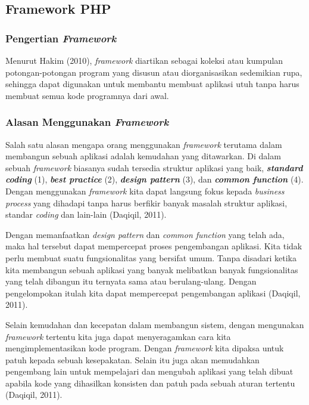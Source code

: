   \subsection{Framework PHP}

    \subsubsection{Pengertian \emph{Framework}}
    Menurut Hakim (2010), \emph{framework} diartikan sebagai koleksi atau kumpulan potongan-potongan program yang disusun atau diorganisasikan sedemikian rupa, sehingga dapat digunakan untuk membantu membuat aplikasi utuh tanpa harus membuat semua kode programnya dari awal.
    
    \subsubsection{Alasan Menggunakan \emph{Framework}}
    Salah satu alasan mengapa orang menggunakan \emph{framework} terutama dalam membangun sebuah aplikasi adalah kemudahan yang ditawarkan. Di dalam sebuah  \emph{framework} biasanya sudah tersedia struktur aplikasi yang baik, \textbf{\emph{standard coding}} (1), \textbf{\emph{best practice}} (2), \textbf{\emph{design pattern}} (3), dan \textbf{\emph{common function}} (4). Dengan menggunakan \emph{framework} kita dapat langsung fokus kepada \emph{business process} yang dihadapi tanpa harus berfikir banyak masalah struktur aplikasi, standar \emph{coding} dan lain-lain (Daqiqil, 2011).
    
    Dengan memanfaatkan \emph{design pattern} dan \emph{common function} yang telah ada, maka hal tersebut dapat mempercepat proses pengembangan aplikasi. Kita tidak perlu membuat suatu fungsionalitas yang bersifat umum. Tanpa disadari ketika kita membangun sebuah aplikasi yang banyak melibatkan banyak fungsionalitas yang telah dibangun itu ternyata sama atau berulang-ulang. Dengan pengelompokan itulah kita dapat mempercepat pengembangan aplikasi (Daqiqil, 2011).
    
    Selain kemudahan dan kecepatan dalam membangun sistem, dengan mengunakan \emph{framework} tertentu kita juga dapat menyeragamkan cara kita mengimplementasikan kode program. Dengan \emph{framework} kita dipaksa untuk patuh kepada sebuah kesepakatan. Selain itu juga akan memudahkan pengembang lain untuk mempelajari dan mengubah aplikasi yang telah dibuat apabila kode yang dihasilkan konsisten dan patuh pada sebuah aturan tertentu (Daqiqil, 2011).

